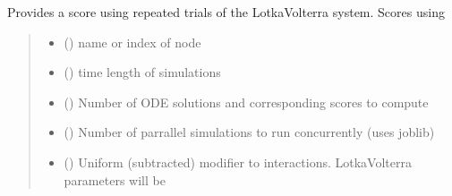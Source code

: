 \documentclass[letterpaper,10pt,english]{sphinxmanual}
\begin{document}
\begin{fulllineitems}

\begin{fulllineitems}
\label{\detokenize{friendlynets:friendlyNet.friendlyNet.lotka_volterra_score}}
\pysigstartsignatures
{}
\pysigstopsignatures
\sphinxAtStartPar
Provides a score using repeated trials of the Lotka\sphinxhyphen{}Volterra system. Scores using {\hyperref[\detokenize{friendlynets:friendlyNet.friendlyNet.lotka_volterra_score_single}]{}}
\begin{quote}\begin{description}
\begin{itemize}
\item {} 
\sphinxAtStartPar
{} () \textendash{} name or index of node

\item {} 
\sphinxAtStartPar
{} () \textendash{} time length of simulations

\item {} 
\sphinxAtStartPar
{} () \textendash{} Number of ODE solutions and corresponding scores to compute

\item {} 
\sphinxAtStartPar
{} () \textendash{} Number of parrallel simulations to run concurrently (uses joblib)

\item {} 
\sphinxAtStartPar
{} () \textendash{} Uniform (subtracted) modifier to interactions. Lotka\sphinxhyphen{}Volterra parameters will be {\hyperref[\detokenize{friendlynets:friendlyNet.friendlyNet.Adjacency}]{}} \sphinxhyphen{} 


\end{itemize}
\end{description}
\end{quote}
\end{fulllineitems}
\end{fulllineitems}
\end{document}
